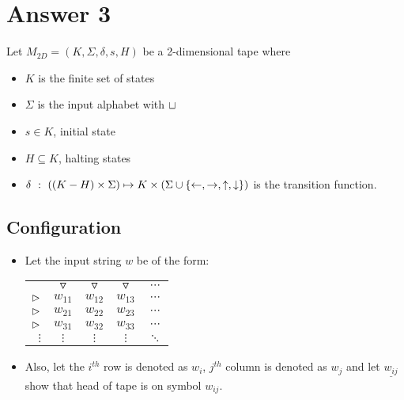 \section*{Answer 3}
\label{answer-3}

Let $M_{2D} = (K, \Sigma, \delta, s, H)$ be a 2-dimensional tape where
\begin{itemize}
  \item $K$ is the finite set of states
  \item $\Sigma$ is the input alphabet with $\sqcup$
  \item $s \in K$, initial state
  \item $H \subseteq K$, halting states
  \item $\delta\ :\ ( (K - H) \times \Sigma) \mapsto K \times ( \Sigma \cup \{ \leftarrow, \rightarrow, \uparrow, \downarrow \} )$ is the transition function.
\end{itemize}

\subsection*{Configuration}
\label{q3-configuration}

\begin{itemize}
  \item Let the input string $w$ be of the form:
    \begin{table}[ht]
      \centering
      \begin{tabular}{rcccc}
                  & $\triangledown$ & $\triangledown$ & $\triangledown$ & $\cdots$  \\
        $\vartriangleright$    & $w_{11}$        & $w_{12}$        & $w_{13}$        & $\cdots$  \\
        $\vartriangleright$    & $w_{21}$        & $w_{22}$        & $w_{23}$        & $\cdots$  \\
        $\vartriangleright$    & $w_{31}$        & $w_{32}$        & $w_{33}$        & $\cdots$  \\
        $\vdots$  & $\vdots$        & $\vdots$        & $\vdots$        & $\ddots$  \\
      \end{tabular}
    \end{table}
  \item Also, let the $i^{th}$ row is denoted as $w_i$, $j^{th}$ column is denoted as $w_j$ and let $\underline{w_{ij}}$ show that head of tape is on symbol $w_{ij}$.
\end{itemize}

